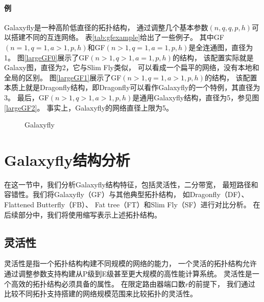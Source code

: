 \paragraph{例}
Galaxyfly是一种高阶低直径的拓扑结构，
通过调整几个基本参数$(n,q,q,p,h)$可以搭建不同的互连网络。
表\ref{tab:gfexample}给出了一些例子。
其中GF$(n=1,q=1,a>1,p,h)$和GF$(n>1,q=1,a=1,p,h)$是全连通图，直径为1。
图\ref{largeGF0}展示了GF$(n>1,q>1,a=1,p,h)$的结构，
该配置实际就是Galaxy图，直径为2，它与Slim Fly类似，
可以看成一个扁平的网络，没有本地和全局的区别。
图\ref{largeGF1}展示了GF$(n>1,q=1,a>1,p,h)$的结构，
该配置本质上就是Dragonfly结构，即Dragonfly可以看作Galaxyfly的一个特例，其直径为3。
最后，GF$(n>1,q>1,a>1,p,h)$是通用Galaxyfly结构，直径为5，参见图\ref{largeGF2}。
事实上，Galaxyfly的网络直径上限为5。

\begin{figure}[t]
  \centering
    \begin{minipage}[t]{\textwidth}
   \centering

  \caption{Galaxyfly}
  \label{gfgraph}
    \end{minipage}
\end{figure}

\section{Galaxyfly结构分析}

在这一节中，我们分析Galaxyfly结构特征，包括灵活性，二分带宽，
最短路径和容错性。我们将Galaxyfly（GF）与其他典型拓扑结构，
如Dragonfly（DF）、Flattened Butterfly（FB）、
Fat tree（FT）和Slim Fly（SF）进行对比分析。
在后续部分中，我们将使用缩写表示上述拓扑结构。

\subsection{灵活性}

灵活性是指一个拓扑结构构建不同规模的网络的能力，
一个灵活的拓扑结构允许通过调整参数支持构建从P级到E级甚至更大规模的高性能计算系统。
灵活性是一个高效的拓扑结构必须具备的属性。
在限定路由器端口数$r$的前提下，
我们通过比较不同拓扑支持搭建的网络规模范围来比较拓扑的灵活性。

